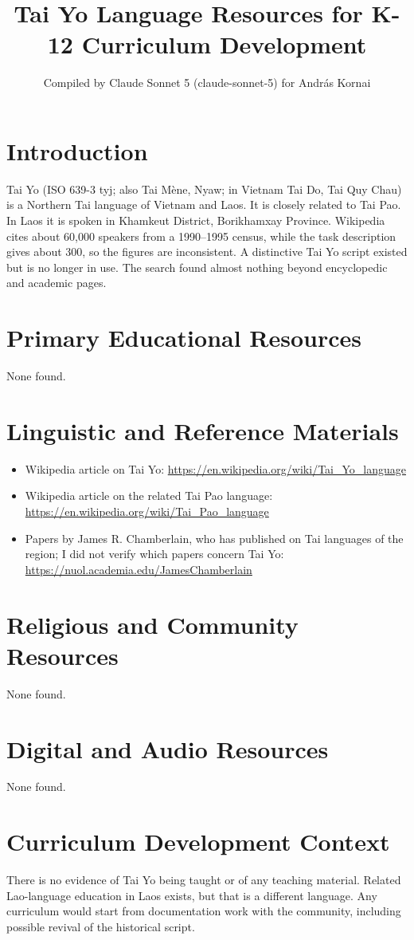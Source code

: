 \documentclass[12pt]{article}
\title{Tai Yo Language Resources for K-12 Curriculum Development}
\author{Compiled by Claude Sonnet 5 (claude-sonnet-5) for Andr\'as Kornai}
\date{}
\begin{document}
\maketitle

\section{Introduction}
Tai Yo (ISO 639-3 tyj; also Tai Mène, Nyaw; in Vietnam Tai Do, Tai Quy Chau) is a Northern Tai language of Vietnam and Laos. It is closely related to Tai Pao. In Laos it is spoken in Khamkeut District, Borikhamxay Province. Wikipedia cites about 60,000 speakers from a 1990--1995 census, while the task description gives about 300, so the figures are inconsistent. A distinctive Tai Yo script existed but is no longer in use. The search found almost nothing beyond encyclopedic and academic pages.

\section{Primary Educational Resources}
None found.

\section{Linguistic and Reference Materials}
\begin{itemize}
\item Wikipedia article on Tai Yo: \url{https://en.wikipedia.org/wiki/Tai_Yo_language}
\item Wikipedia article on the related Tai Pao language: \url{https://en.wikipedia.org/wiki/Tai_Pao_language}
\item Papers by James R. Chamberlain, who has published on Tai languages of the region; I did not verify which papers concern Tai Yo: \url{https://nuol.academia.edu/JamesChamberlain}
\end{itemize}

\section{Religious and Community Resources}
None found.

\section{Digital and Audio Resources}
None found.

\section{Curriculum Development Context}
There is no evidence of Tai Yo being taught or of any teaching material. Related Lao-language education in Laos exists, but that is a different language. Any curriculum would start from documentation work with the community, including possible revival of the historical script.
\end{document}
